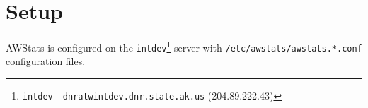 
\newpage
\section{Setup}
AWStats is configured on the \texttt{intdev}\footnote{\texttt{intdev} - 
\texttt{dnratwintdev.dnr.state.ak.us} (204.89.222.43)} server
with \texttt{/etc/awstats/awstats.*.conf} configuration files.

